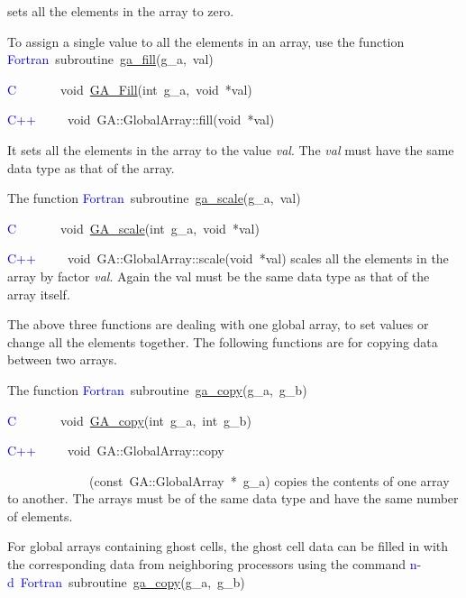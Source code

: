 sets all the elements in the array to zero.

To assign a single value to all the elements in an array, use the
function
\textcolor{blue}{Fortran}~subroutine~\href{http://www.emsl.pnl.gov/docs/global/ga_ops.html\#ga_fill}{ga\_{}fill}(g\_a,~val)~

\textcolor{blue}{C}~~~~~~~void~\href{http://www.emsl.pnl.gov/docs/global/c_nga_ops.html\#ga_fill}{GA\_{}Fill}(int~g\_a,~void~{*}val)~

\textcolor{blue}{C++}~~~~~void~GA::GlobalArray::fill(void~{*}val)

It sets all the elements in the array to the value \emph{val}. The
\emph{val} must have the same data type as that of the array.

The function
\textcolor{blue}{Fortran}~subroutine~\href{http://www.emsl.pnl.gov/docs/global/ga_ops.html\#ga_scale}{ga\_{}scale}(g\_a,~val)~

\textcolor{blue}{C}~~~~~~~void~\href{http://www.emsl.pnl.gov/docs/global/c_nga_ops.html\#ga_scale}{GA\_{}scale}(int~g\_a,~void~{*}val)~

\textcolor{blue}{C++}~~~~~void~GA::GlobalArray::scale(void~{*}val)
scales all the elements in the array by factor \emph{val}. Again the
val must be the same data type as that of the array itself.

The above three functions are dealing with one global array, to set
values or change all the elements together. The following functions
are for copying data between two arrays.

The function
\textcolor{blue}{Fortran}~subroutine~\href{http://www.emsl.pnl.gov/docs/global/ga_ops.html\#ga_copy}{ga\_{}copy}(g\_a,~g\_b)~

\textcolor{blue}{C}~~~~~~~void~\href{http://www.emsl.pnl.gov/docs/global/c_nga_ops.html\#ga_copy}{GA\_{}copy}(int~g\_a,~int~g\_b)~

\textcolor{blue}{C++}~~~~~void~GA::GlobalArray::copy

~~~~~~~~~~~~~(const~GA::GlobalArray~{*}~g\_a)
copies the contents of one array to another. The arrays must be of
the same data type and have the same number of elements.

For global arrays containing ghost cells, the ghost cell data can
be filled in with the corresponding data from neighboring processors
using the command
\textcolor{blue}{n-d~Fortran}~subroutine~\href{http://www.emsl.pnl.gov/docs/global/ga_ops.html\#ga_copy}{ga\_{}copy}(g\_a,~g\_b)~

